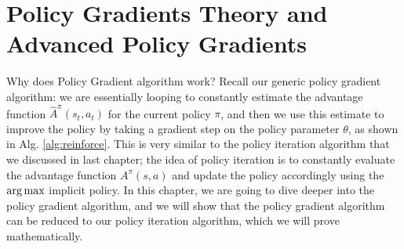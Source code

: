 \chapter{Policy Gradients Theory and Advanced Policy Gradients}
Why does Policy Gradient algorithm work? Recall our generic policy gradient algorithm: we are essentially looping to constantly estimate the advantage function $\hat{A}^\pi(s_t,a_t)$ for the current policy $\pi$, and then we use this estimate to improve the policy by taking a gradient step on the policy parameter $\theta$, as shown in Alg. \ref{alg:reinforce}. This is very similar to the policy iteration algorithm that we discussed in last chapter; the idea of policy iteration is to constantly evaluate the advantage function $A^\pi(s,a)$ and update the policy accordingly using the $\operatorname*{arg\,max}$ implicit policy. In this chapter, we are going to dive deeper into the policy gradient algorithm, and we will show that the policy gradient algorithm can be reduced to our policy iteration algorithm, which we will prove mathematically. 

